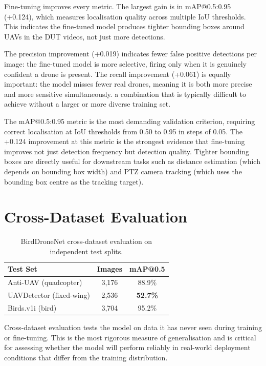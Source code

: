 \documentclass[12pt,a4paper]{report}
\renewcommand{\arraystretch}{1.1}
\begin{document}
Fine-tuning improves every metric. The largest gain is in mAP@0.5:0.95
(+0.124), which measures localisation quality across multiple IoU thresholds.
This indicates the fine-tuned model produces tighter bounding boxes around
UAVs in the DUT videos, not just more detections.

The precision improvement (+0.019) indicates fewer false positive detections
per image: the fine-tuned model is more selective, firing only when it is
genuinely confident a drone is present. The recall improvement (+0.061) is
equally important: the model misses fewer real drones, meaning it is both
more precise and more sensitive simultaneously. a combination that is
typically difficult to achieve without a larger or more diverse training set.

The mAP@0.5:0.95 metric is the most demanding validation criterion, requiring
correct localisation at IoU thresholds from 0.50 to 0.95 in steps of 0.05.
The +0.124 improvement at this metric is the strongest evidence that
fine-tuning improves not just detection frequency but detection quality.
Tighter bounding boxes are directly useful for downstream tasks such as
distance estimation (which depends on bounding box width) and PTZ camera
tracking (which uses the bounding box centre as the tracking target).

\section{Cross-Dataset Evaluation}
\label{sec:cross_dataset_eval}

\begin{table}[H]
\centering
\caption[Cross-dataset evaluation results]{BirdDroneNet cross-dataset evaluation on independent test splits.}
\label{tab:cross}
\renewcommand{\arraystretch}{0.9}
\begin{tabular}{|l|c|c|}
\hline
\rowcolor{gray!20}
\textbf{Test Set} & \textbf{Images} & \textbf{mAP@0.5} \\
\hline
Anti-UAV (quadcopter)    & 3,176  & 88.9\% \\
\hline
UAVDetector (fixed-wing) & 2,536  & \textbf{52.7\%} \\
\hline
Birds.v1i (bird)         & 3,704  & 95.2\% \\
\hline
\end{tabular}
\end{table}

Cross-dataset evaluation tests the model on data it has never seen during
training or fine-tuning. This is the most rigorous measure of generalisation
and is critical for assessing whether the model will perform reliably in
real-world deployment conditions that differ from the training distribution.
\end{document}
